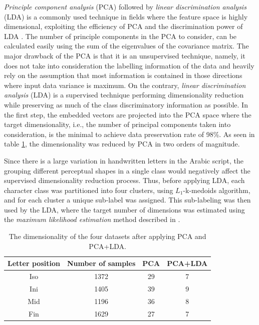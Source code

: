 \documentclass[10pt, conference, compsocconf]{IEEEtran}
\begin{document}
\emph{Principle component analysis} (PCA) followed by \emph{linear discrimination analysis} (LDA) is a commonly used technique in fields where the feature space is highly dimensional, exploiting the efficiency of PCA and the discrimination power of LDA \cite{yu2001direct,yang2003can}.
The number of principle components in the PCA to consider, can be calculated easily using the sum of the eigenvalues of the covariance matrix.
The major drawback of the PCA is that it is an unsupervised technique, namely, it does not take into consideration the labelling information of the data and heavily rely on the assumption that most information is contained in those directions where input data variance is maximum.
On the contrary, \emph{linear discrimination analysis} (LDA) \cite{fisher1936use} is a supervised technique performing dimensionality reduction while preserving as much of the class discriminatory information as possible. 
In the first step, the embedded vectors are projected into the PCA space where the target dimensionality, i.e., the number of principal components taken into consideration, is the minimal to achieve data preservation rate of 98\%.
As seen in table \ref{table:dr_dimensions_results}, the dimensionality was reduced by PCA in two orders of magnitude.

Since there is a large variation in handwritten letters in the Arabic script, the grouping different perceptual shapes in a single class would negatively affect the supervised dimensionality reduction process.
Thus, before applying LDA, each character class was partitioned into four clusters, using $L_1$-k-medoids algorithm, and for each cluster a unique sub-label was assigned. 
This sub-labeling was then used by the LDA, where the target number of dimensions was estimated using the \emph{maximum likelihood estimation} method described in \cite{levina2004maximum}.

\begin{table}
\centering
\begin{tabular}{ | c | c | c | c |}
\hline
Letter position & Number of samples & PCA & PCA+LDA\\
\hline                 
  Iso & 1372 & 29 & 7 \\ 
  \hline
  Ini & 1405 & 39 & 9 \\ 
  \hline
  Mid & 1196 & 36 & 8 \\ 
  \hline
  Fin & 1629 & 27 & 7 \\ 
  \hline
\end{tabular}
\caption{The dimensionality of the four datasets after applying PCA and PCA+LDA.}
\label{table:dr_dimensions_results} 
\end{table}
\end{document}
